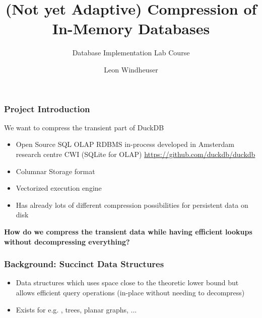 \documentclass{beamer}
\title{(Not yet Adaptive) Compression of In-Memory Databases}
\subtitle{Database Implementation Lab Course}
\author{Leon Windheuser}
\begin{document}
\frame{\titlepage}


\begin{frame}
    \frametitle{Project Introduction}
    We want to compress the transient part of DuckDB
    \pause

    \begin{itemize}
        \item Open Source SQL OLAP RDBMS in-process developed in Amsterdam research centre CWI (SQLite for OLAP)
        \url{https://github.com/duckdb/duckdb}
        \item Columnar Storage format
        \item Vectorized execution engine
        \item Has already lots of different compression possibilities for persistent data on disk 
    \end{itemize}

    \vspace{1cm}
    \pause
    \centering
    \textbf{How do we compress the transient data while having efficient lookups without decompressing everything?}
\end{frame}


\begin{frame}
    \frametitle{Background: Succinct Data Structures}
    
    \begin{itemize}
        \item Data structures which uses space close to the theoretic
            lower bound but allows efficient query operations (in-place without needing to decompress)
        \item Exists for e.g. {}, trees, planar graphs, ...
    \end{itemize}
\end{frame}
\end{document}
